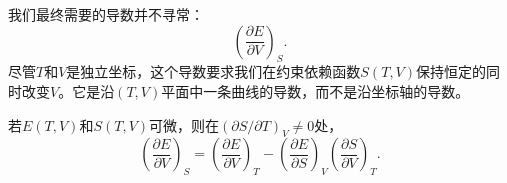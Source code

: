 我们最终需要的导数并不寻常：
\[
 \left(\frac{\partial E}{\partial V}\right)_S.
\]
尽管\(T\)和\(V\)是独立坐标，这个导数要求我们在约束依赖函数\(S(T,V)\)保持恒定的同时改变\(V\)。它是沿\((T,V)\)平面中一条曲线的导数，而不是沿坐标轴的导数。

\begin{classroomqa}
\end{classroomqa}

\begin{lemma}
若\(E(T,V)\)和\(S(T,V)\)可微，则在\((\partial S/\partial T)_V\neq0\)处，
\begin{equation}
 \left(\frac{\partial E}{\partial V}\right)_S
 =
 \left(\frac{\partial E}{\partial V}\right)_T
 -
 \left(\frac{\partial E}{\partial S}\right)_V
 \left(\frac{\partial S}{\partial V}\right)_T.
 \label{eq:sm5-calculus-lemma}
\end{equation}
\end{lemma}

